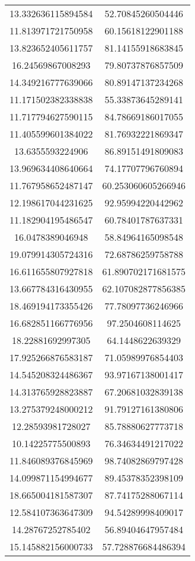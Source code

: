 \begin{table}
\begin{tabular}{cc}
13.332636115894584 & 52.70845260504446 \\
11.813971721750958 & 60.15618122901188 \\
13.823652405611757 & 81.14155918683845 \\
16.24569867008293 & 79.80737876857509 \\
14.349216777639066 & 80.89147137234268 \\
11.171502382338838 & 55.33873645289141 \\
11.717794627590115 & 84.78669186017055 \\
11.405599601384022 & 81.76932221869347 \\
13.6355593224906 & 86.89151491809083 \\
13.969634408640664 & 74.17707796760894 \\
11.767958652487147 & 60.253060605266946 \\
12.198617044231625 & 92.95994220442962 \\
11.182904195486547 & 60.78401787637331 \\
16.0478389046948 & 58.84964165098548 \\
19.079914305724316 & 72.68786259758788 \\
16.611655807927818 & 61.890702171681575 \\
13.667784316430955 & 62.107082877856385 \\
18.469194173355426 & 77.78097736246966 \\
16.682851166776956 & 97.2504608114625 \\
18.22881692997305 & 64.1448622639329 \\
17.925266876583187 & 71.05989976854403 \\
14.545208324486367 & 93.97167138001417 \\
14.313765928823887 & 67.20681032839138 \\
13.275379248000212 & 91.79127161380806 \\
12.28593981728027 & 85.78880627773718 \\
10.14225775500893 & 76.34634491217022 \\
11.846089376845969 & 98.74082869797428 \\
14.099871154994677 & 89.45378352398109 \\
18.665004181587307 & 87.74175288067114 \\
12.584107363647309 & 94.54289998409017 \\
14.28767252785402 & 56.89404647957484 \\
15.145882156000733 & 57.728876684486394 \\

\end{tabular}
\end{table}
